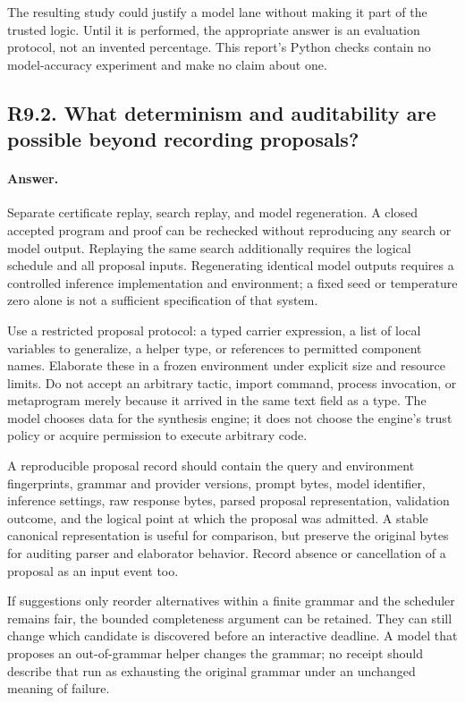 \documentclass[11pt,a4paper]{article}
\newcommand{\answer}{\paragraph{Answer.}}
\theoremstyle{definition}
\theoremstyle{remark}
\begin{document}
The resulting study could justify a model lane without making it part of the
trusted logic. Until it is performed, the appropriate answer is an evaluation
protocol, not an invented percentage. This report's Python checks contain no
model-accuracy experiment and make no claim about one.

\subsection{R9.2. What determinism and auditability are possible beyond recording proposals?}
\answer Separate certificate replay, search replay, and model regeneration. A
closed accepted program and proof can be rechecked without reproducing any
search or model output. Replaying the same search additionally requires the
logical schedule and all proposal inputs. Regenerating identical model outputs
requires a controlled inference implementation and environment; a fixed seed
or temperature zero alone is not a sufficient specification of that system.

Use a restricted proposal protocol: a typed carrier expression, a list of local
variables to generalize, a helper type, or references to permitted component
names. Elaborate these in a frozen environment under explicit size and resource
limits. Do not accept an arbitrary tactic, import command, process invocation,
or metaprogram merely because it arrived in the same text field as a type.
The model chooses data for the synthesis engine; it does not choose the engine's
trust policy or acquire permission to execute arbitrary code.

A reproducible proposal record should contain the query and environment
fingerprints, grammar and provider versions, prompt bytes, model identifier,
inference settings, raw response bytes, parsed proposal representation,
validation outcome, and the logical point at which the proposal was admitted.
A stable canonical representation is useful for comparison, but preserve the
original bytes for auditing parser and elaborator behavior. Record absence or
cancellation of a proposal as an input event too.

If suggestions only reorder alternatives within a finite grammar and the
scheduler remains fair, the bounded completeness argument can be retained.
They can still change which candidate is discovered before an interactive
deadline. A model that proposes an out-of-grammar helper changes the grammar;
no receipt should describe that run as exhausting the original grammar under
an unchanged meaning of failure.
\end{document}
